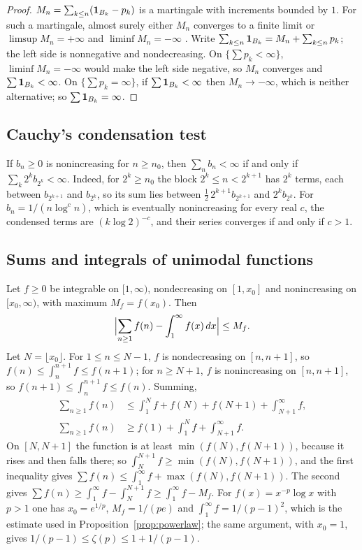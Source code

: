 \begin{proof}
$M_{n}=\sum_{k\le n}(\mathbf{1}_{B_{k}}-p_{k})$ is a martingale with increments bounded by $1$. For such a martingale, almost surely either $M_{n}$ converges to a finite limit or $\limsup M_{n}=+\infty$ and $\liminf M_{n}=-\infty$ \cite[Section~4.3]{Dur19}. Write $\sum_{k\le n}\mathbf{1}_{B_{k}}=M_{n}+\sum_{k\le n}p_{k}$; the left side is nonnegative and nondecreasing. On $\{\sum p_{k}<\infty\}$, $\liminf M_{n}=-\infty$ would make the left side negative, so $M_{n}$ converges and $\sum\mathbf{1}_{B_{k}}<\infty$. On $\{\sum p_{k}=\infty\}$, if $\sum\mathbf{1}_{B_{k}}<\infty$ then $M_{n}\to-\infty$, which is neither alternative; so $\sum\mathbf{1}_{B_{k}}=\infty$.
\end{proof}

\subsection{Cauchy's condensation test}\label{app:condensation}

If $b_{n}\ge0$ is nonincreasing for $n\ge n_{0}$, then $\sum_{n}b_{n}<\infty$ if and only if $\sum_{k}2^{k}b_{2^{k}}<\infty$. Indeed, for $2^{k}\ge n_{0}$ the block $2^{k}\le n<2^{k+1}$ has $2^{k}$ terms, each between $b_{2^{k+1}}$ and $b_{2^{k}}$, so its sum lies between $\frac12\,2^{k+1}b_{2^{k+1}}$ and $2^{k}b_{2^{k}}$. For $b_{n}=1/(n\log^{c}n)$, which is eventually nonincreasing for every real $c$, the condensed terms are $(k\log2)^{-c}$, and their series converges if and only if $c>1$.

\subsection{Sums and integrals of unimodal functions}\label{app:zeta}

Let $f\ge0$ be integrable on $[1,\infty)$, nondecreasing on $[1,x_{0}]$ and nonincreasing on $[x_{0},\infty)$, with maximum $M_{f}=f(x_{0})$. Then
\[
\Bigl|\sum_{n\ge1}f(n)-\int_{1}^{\infty}f(x)\,dx\Bigr|\le M_{f}.
\]
Let $N=\lfloor x_{0}\rfloor$. For $1\le n\le N-1$, $f$ is nondecreasing on $[n,n+1]$, so $f(n)\le\int_{n}^{n+1}f\le f(n+1)$; for $n\ge N+1$, $f$ is nonincreasing on $[n,n+1]$, so $f(n+1)\le\int_{n}^{n+1}f\le f(n)$. Summing,
\[
\begin{aligned}
\sum_{n\ge1}f(n)&\le\int_{1}^{N}f+f(N)+f(N+1)+\int_{N+1}^{\infty}f,\\
\sum_{n\ge1}f(n)&\ge f(1)+\int_{1}^{N}f+\int_{N+1}^{\infty}f .
\end{aligned}
\]
On $[N,N+1]$ the function is at least $\min(f(N),f(N+1))$, because it rises and then falls there; so $\int_{N}^{N+1}f\ge\min(f(N),f(N+1))$, and the first inequality gives $\sum f(n)\le\int_{1}^{\infty}f+\max(f(N),f(N+1))$. The second gives $\sum f(n)\ge\int_{1}^{\infty}f-\int_{N}^{N+1}f\ge\int_{1}^{\infty}f-M_{f}$. For $f(x)=x^{-p}\log x$ with $p>1$ one has $x_{0}=e^{1/p}$, $M_{f}=1/(pe)$ and $\int_{1}^{\infty}f=1/(p-1)^{2}$, which is the estimate used in Proposition~\ref{prop:powerlaw}; the same argument, with $x_{0}=1$, gives $1/(p-1)\le\zeta(p)\le1+1/(p-1)$.

